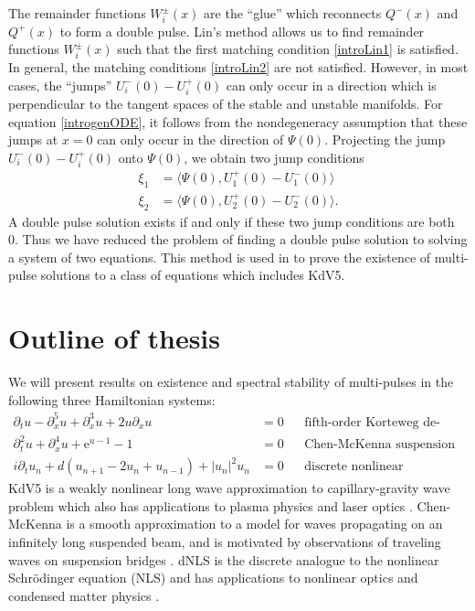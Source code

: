 \documentclass[thesis2.tex]{subfiles}
\begin{document}
The remainder functions $W_i^\pm(x)$ are the ``glue'' which reconnects $Q^-(x)$ and $Q^+(x)$ to form a double pulse. Lin's method allows us to find remainder functions $W_i^\pm(x)$ such that the first matching condition \cref{introLin1} is satisfied. In general, the matching conditions \cref{introLin2} are not satisfied. However, in most cases, the ``jumps'' $U_i^-(0) - U_i^+(0)$ can only occur in a direction which is perpendicular to the tangent spaces of the stable and unstable manifolds. For equation \cref{introgenODE}, it follows from the nondegeneracy assumption that these jumps at $x = 0$ can only occur in the direction of $\Psi(0)$. Projecting the jump $U_i^-(0) - U_i^+(0)$ onto $\Psi(0)$, we obtain two jump conditions
\begin{equation}\label{introLinJump}
\begin{aligned}
\xi_1 &= \langle \Psi(0), U_1^+(0) - U_1^-(0) \rangle \\
\xi_2 &= \langle \Psi(0), U_2^+(0) - U_2^-(0) \rangle.
\end{aligned}
\end{equation} 
A double pulse solution exists if and only if these two jump conditions are both 0. Thus we have reduced the problem of finding a double pulse solution to solving a system of two equations. This method is used in \cite{SandstedeStrut} to prove the existence of multi-pulse solutions to a class of equations which includes KdV5. 

\section{Outline of thesis}

We will present results on existence and spectral stability of multi-pulses in the following three Hamiltonian systems:
\begin{align*}
\partial_t u - \partial_x^5 u + \partial_x^3 u + 2 u \partial_x u &= 0 && \text{fifth-order Korteweg de-Vries equation (KdV5)} \\
\partial_t^2 u + \partial_x^4 u + \mathrm{e}^{u-1} - 1 &= 0 &&\text{Chen-McKenna suspension bridge equation} \\
i\partial_t u_n + d(u_{n+1} - 2 u_n + u_{n-1}) + |u_n|^2 u_n &= 0 &&\text{discrete nonlinear Schrodinger equation (dNLS)}
\end{align*}
KdV5 is a weakly nonlinear long wave approximation to capillary-gravity wave problem which also has applications to plasma physics and laser optics \cite{Pelinovsky2007}. Chen-McKenna is a smooth approximation to a model for waves propagating on an infinitely long suspended beam, and is motivated by observations of traveling waves on suspension bridges \cite{McKenna1990,Chen1997}. dNLS is the discrete analogue to the nonlinear Schr{\"o}dinger equation (NLS) and has applications to nonlinear optics and condensed matter physics \cite{Kevrekidis2009}.
\end{document}
